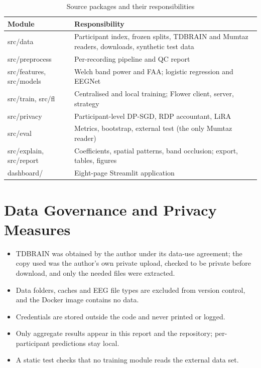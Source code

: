 \documentclass[12pt,a4paper,oneside]{report}
\begin{document}
\begin{table}[!htbp]\centering\small{}
\caption{Source packages and their responsibilities}\label{tab:modules}
\begin{tabularx}{\textwidth}{lX}
\toprule
Module & Responsibility\\
\midrule
src/data & Participant index, frozen splits, TDBRAIN and Mumtaz readers, downloads, synthetic test data\\
src/preprocess & Per-recording pipeline and QC report\\
src/features, src/models & Welch band power and FAA; logistic regression and EEGNet\\
src/train, src/fl & Centralised and local training; Flower client, server, strategy\\
src/privacy & Participant-level DP-SGD, RDP accountant, LiRA\\
src/eval & Metrics, bootstrap, external test (the only Mumtaz reader)\\
src/explain, src/report & Coefficients, spatial patterns, band occlusion; export, tables, figures\\
dashboard/ & Eight-page Streamlit application\\
\bottomrule
\end{tabularx}
\end{table}

\section{Data Governance and Privacy Measures}
\begin{itemize}[leftmargin=1.6em,itemsep=2pt,topsep=2pt]
\item TDBRAIN was obtained by the author under its data-use agreement; the copy used was the author's own private upload, checked to be private before download, and only the needed files were extracted.
\item Data folders, caches and EEG file types are excluded from version control, and the Docker image contains no data.
\item Credentials are stored outside the code and never printed or logged.
\item Only aggregate results appear in this report and the repository; per-participant predictions stay local.
\item A static test checks that no training module reads the external data set.
\end{itemize}
\end{document}
